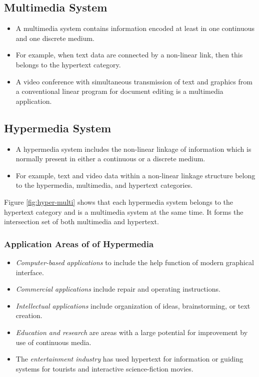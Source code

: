 \subsection[Multimedia]{Multimedia System}
\begin{multicols}{2}
	\begin{itemize}
		\item A multimedia system contains information encoded at least in one continuous and one discrete medium. 
		\item For example, when text data are connected by a non-linear link, then this belongs to the hypertext category. 
		\item A video conference with simultaneous transmission of text and graphics from a conventional linear program for document editing is a multimedia application.
	\end{itemize}
\end{multicols}


\subsection[Hypermedia]{Hypermedia System}
\begin{multicols}{2}
	\begin{itemize}
		\item A hypermedia system includes the non-linear linkage of information which is normally present in either a continuous or a discrete medium. 
		\item For example, text and video data within a non-linear linkage structure belong to the hypermedia, multimedia, and hypertext categories.
	\end{itemize}
\end{multicols}



Figure {\ref{fig:hyper-multi}} shows that each hypermedia system belongs to the hypertext category and is a multimedia system at the same time. It forms the intersection set of both multimedia and hypertext.

\subsubsection*{Application Areas of of Hypermedia}
\begin{multicols}{2}
	\begin{itemize}
		\item \textit{Computer-based applications} to include the help function of modern graphical interface.
		\item \textit{Commercial applications} include repair and operating instructions.
		\item \textit{Intellectual applications} include organization of ideas, brainstorming, or text creation.
		\item \textit{Education and research} are areas with a large potential for improvement by use of continuous media.
		\item The \textit{entertainment industry} has used hypertext for information or guiding systems for tourists and interactive science-fiction movies.
	\end{itemize}
\end{multicols}


